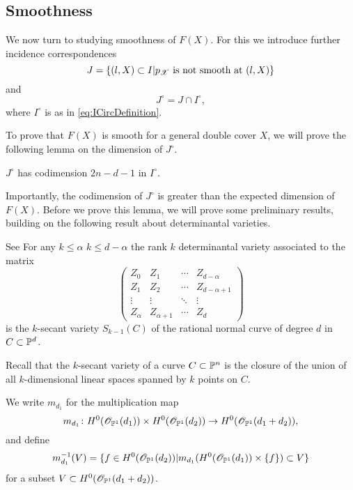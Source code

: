 \subsection{Smoothness}
We now turn to studying smoothness of $F(X)$. For this we introduce further incidence correspondences
\begin{equation}
  \label{eq:JDefinition}
  J = \set{(l,X) \subset I \vert p_{\mathscr{X}} \text{ is not smooth at } (l,X)}
\end{equation}
and
\begin{equation}
\label{eq:JCircDefinition}
J^\circ = J \cap I^\circ,
\end{equation}
where $I^\circ$ is as in \eqref{eq:ICircDefinition}.

To prove that $F(X)$ is smooth for a general double cover $X$, we will prove the following lemma on the dimension of $J^\circ$.
\begin{lemma}
  \label{lem:JCircCodimension}
  $J^\circ$ has codimension $2n-d-1$ in $I^\circ$.
\end{lemma}
Importantly, the codimension of $J^\circ$ is greater than the expected dimension of $F(X)$. Before we prove this lemma, we will prove some preliminary results, building on the following result about determinantal varieties.
\begin{proposition}{{See \cite[Proposition 9.7]{Harris95}}}
  \label{prop:DeterminantalSecantVariety}
  For any $k \leq \alpha$ $k \leq d - \alpha$ the rank $k$ determinantal variety associated to the matrix
\[
  \begin{pmatrix}
    Z_0 & Z_1 & \cdots & Z_{d-\alpha} \\
    Z_1 & Z_2 & \cdots & Z_{d-\alpha+1}\\
    \vdots & \vdots & \ddots & \vdots \\
    Z_\alpha & Z_{\alpha + 1} & \cdots & Z_{d}
  \end{pmatrix}
\]
is the $k$-secant variety $S_{k-1}(C)$ of the rational normal curve of degree $d$ in $C \subset \P^d$.
\end{proposition}
 Recall that the $k$-secant variety of a curve $C \subset \P^n$ is the closure of the union of all $k$-dimensional linear spaces spanned by $k$ points on $C$.

We write $m_{d_1}$ for the multiplication map
\[m_{d_1} \from H^0(\sO_{\P^1}(d_1)) \times H^0(\sO_{\P^1}(d_2)) \to H^0(\sO_{\P^1}(d_1+d_2)),\]
and define
\[m_{d_1}^{-1}(V) = \set{f \in H^0(\sO_{\P^1}(d_2)) \vert m_{d_1}(H^0(\sO_{\P^1}(d_1)) \times \set{f}) \subset V }\]
for a subset $V \subset H^0(\sO_{\P^1}(d_1+d_2))$.

